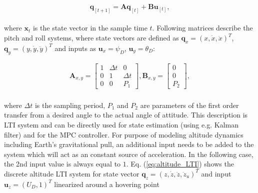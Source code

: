 \begin{equation}
\mathbf{q}_{[t+1]} = \mathbf{A}\mathbf{q}_{[t]}+ \mathbf{B}\mathbf{u}_{[t]},
\label{eq:lti_state_space}
\end{equation}
\\
where $\mathbf{x}_{t}$ is the state vector in the sample time $t$. Following matrices describe the pitch and roll systems, where state vectors are defined as $\mathbf{q}_{x} = \left(x, \dot{x}, \ddot{x}\right)^T$, $\mathbf{q}_{y} = \left(y, \dot{y}, \ddot{y}\right)^T$ and inputs as $\mathbf{u}_x = \psi_D$, $\mathbf{u}_y = \theta_D$:

\begin{equation}
\begin{split}
\mathbf{A}_{x, y} = \begin{bmatrix}
1 & \Delta t & 0 \\
0 & 1 & \Delta t \\
0 & 0 & P_1
\end{bmatrix}, \mathbf{B}_{x, y} = \begin{bmatrix}
0\\
0\\
P_2
\end{bmatrix},
\end{split}
\label{eq:attitude_LTI}
\end{equation}
\\
where $\Delta t$ is the sampling period, $P_1$ and $P_2$ are parameters of the first order transfer from a desired angle to the actual angle of attitude. This description is LTI system and can be directly used for state estimation (using e.g. Kalman filter) and for the MPC controller. For purpose of modeling altitude dynamics including Earth's gravitational pull, an additional input needs to be added to the system which will act as an constant source of acceleration. In the following case, the 2nd input value is always equal to $1$. Eq. (\ref{eq:altitude_LTI}) shows the discrete altitude LTI system for state vector $\mathbf{q}_{z} = \left(z, \dot{z}, \ddot{z}, \ddot{z}_u\right)^T$ and input $\mathbf{u}_z = \left(U_D, 1\right)^T$ linearized around a hovering point

